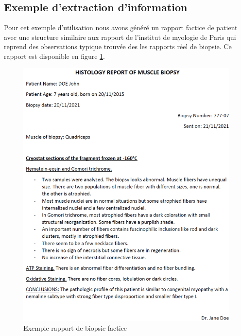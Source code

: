\subsection{Exemple d'extraction d'information}
Pour cet exemple d'utilisation nous avons généré un rapport factice de patient avec une structure similaire aux rapport de l'institut de myologie de Paris qui reprend des observations typique trouvée des les rapports réel de biopsie. Ce rapport est disponible en figure \ref{fig:factice_report}. 
\begin{figure}[htbp]
  \centering
  \includegraphics[width=1\textwidth]{figures/pdf_biopsie.png}
  \caption[Rapport de biopsie factice]{Exemple rapport de biopsie factice}
  \label{fig:factice_report}
\end{figure}

